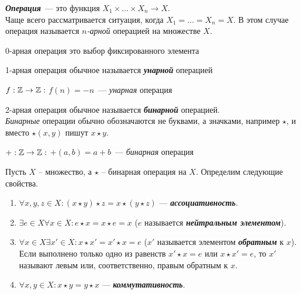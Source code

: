\documentclass{article}
\begin{document}
    \large


    \setcounter{task_boxed}{0}

    \begin{definition_boxed}
        \textit{\textbf{Операция}}~--- это функция $X_1 \times \dotsc \times X_n \rightarrow X.$\\
        Чаще всего рассматривается ситуация, когда $X_1 = \dotsc = X_n = X$.
        В этом случае операция называется $n$\textit{-арной} операцией на множестве $X$.
    \end{definition_boxed}

    \begin{example}
        0-арная операция это выбор фиксированного элемента
    \end{example}

    \begin{definition_boxed}
        1-арная операция обычное называется \textit{\textbf{унарной}} операцией
    \end{definition_boxed}


    \begin{example}
        $f : \mathbb{Z} \rightarrow \mathbb{Z}:$ $f(n) = -n$~--- \textit{унарная} операция
    \end{example}

    \begin{definition_boxed}
        2-арная операция обычное называется \textit{\textbf{бинарной}} операцией.\\
        \textit{Бинарные} операции обычно обозначаются не буквами, а значками, например $\star$, и вместо $\star(x, y)$ пишут $x \star y$.
    \end{definition_boxed}


    \begin{example}
        $+ : \mathbb{Z} \rightarrow \mathbb{Z}:$ $+(a, b) = a + b$~--- \textit{бинарная} операция
    \end{example}

    \begin{definition_boxed}
        Пусть $X$ – множество, а $\star$ – бинарная операция на $X$.
        Определим следующие свойства.
        \begin{enumerate}[label*=\textbf{(\arabic{enumi})}]
            \item $\forall x,y,z \in X: (x \star y) \star z = x \star (y \star z)$ --- \textit{\textbf{ассоциативность}}.
            \item $\exists e \in X \forall x \in X: e \star x = x \star e = x$ ($e$ называется \textit{\textbf{нейтральным элементом}}).
            \item $\forall x \in X \exists x' \in X: x \star x' = x' \star x = e$ ($x'$ называется элементом \textit{\textbf{обратным}} к $x$). Если выполнено только одно из равенств $x' \star x = e$ или $x \star x' = e$, то $x'$ называют левым или, соответственно, правым обратным к $x$.
            \item $\forall x,y \in X: x \star y = y \star x$ --- \textit{\textbf{коммутативность}}.
        \end{enumerate}
    \end{definition_boxed}
\end{document}
